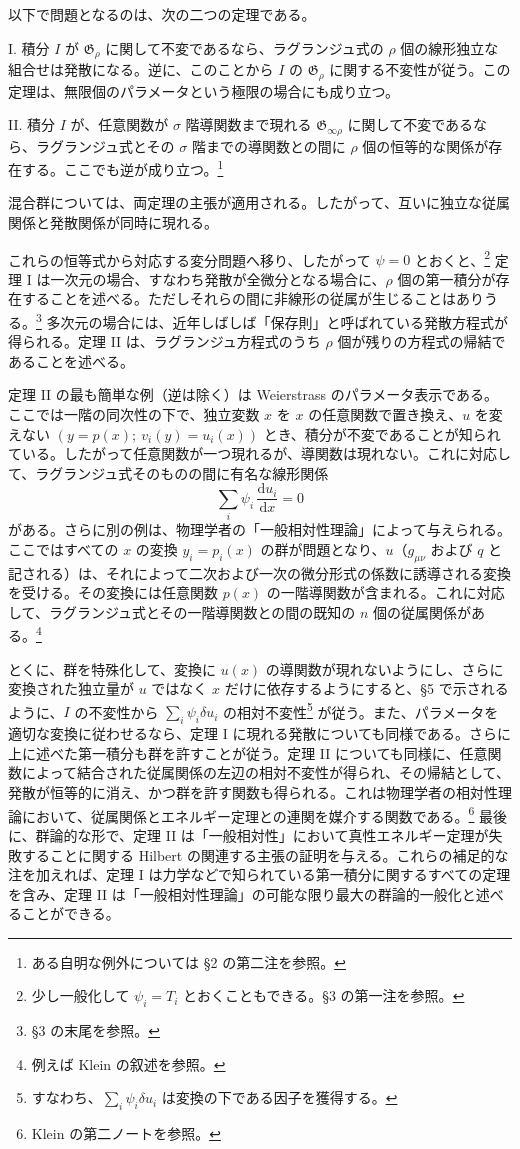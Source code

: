 \documentclass[11pt]{article}
\providecommand{\dd}{\mathrm d}
\providecommand{\G}{\mathfrak G}
\begin{document}
以下で問題となるのは、次の二つの定理である。

I. 積分 \(I\) が \(\G_\rho\) に関して不変であるなら、ラグランジュ式の \(\rho\) 個の線形独立な組合せは発散になる。逆に、このことから \(I\) の \(\G_\rho\) に関する不変性が従う。この定理は、無限個のパラメータという極限の場合にも成り立つ。

II. 積分 \(I\) が、任意関数が \(\sigma\) 階導関数まで現れる \(\G_{\infty\rho}\) に関して不変であるなら、ラグランジュ式とその \(\sigma\) 階までの導関数との間に \(\rho\) 個の恒等的な関係が存在する。ここでも逆が成り立つ。\footnote{ある自明な例外については \S{}2 の第二注を参照。}

混合群については、両定理の主張が適用される。したがって、互いに独立な従属関係と発散関係が同時に現れる。

これらの恒等式から対応する変分問題へ移り、したがって \(\psi=0\) とおくと、\footnote{少し一般化して \(\psi_i=T_i\) とおくこともできる。\S{}3 の第一注を参照。} 定理 I は一次元の場合、すなわち発散が全微分となる場合に、\(\rho\) 個の第一積分が存在することを述べる。ただしそれらの間に非線形の従属が生じることはありうる。\footnote{\S{}3 の末尾を参照。} 多次元の場合には、近年しばしば「保存則」と呼ばれている発散方程式が得られる。定理 II は、ラグランジュ方程式のうち \(\rho\) 個が残りの方程式の帰結であることを述べる。

定理 II の最も簡単な例（逆は除く）は Weierstrass のパラメータ表示である。ここでは一階の同次性の下で、独立変数 \(x\) を \(x\) の任意関数で置き換え、\(u\) を変えない \((y=p(x);\ v_i(y)=u_i(x))\) とき、積分が不変であることが知られている。したがって任意関数が一つ現れるが、導関数は現れない。これに対応して、ラグランジュ式そのものの間に有名な線形関係
\[
\sum_i \psi_i\,\frac{\dd u_i}{\dd x}=0
\]
がある。さらに別の例は、物理学者の「一般相対性理論」によって与えられる。ここではすべての \(x\) の変換 \(y_i=p_i(x)\) の群が問題となり、\(u\)（\(g_{\mu\nu}\) および \(q\) と記される）は、それによって二次および一次の微分形式の係数に誘導される変換を受ける。その変換には任意関数 \(p(x)\) の一階導関数が含まれる。これに対応して、ラグランジュ式とその一階導関数との間の既知の \(n\) 個の従属関係がある。\footnote{例えば Klein の叙述を参照。}

とくに、群を特殊化して、変換に \(u(x)\) の導関数が現れないようにし、さらに変換された独立量が \(u\) ではなく \(x\) だけに依存するようにすると、\S{}5 で示されるように、\(I\) の不変性から \(\sum_i\psi_i\delta u_i\) の相対不変性\footnote{すなわち、\(\sum_i\psi_i\delta u_i\) は変換の下である因子を獲得する。} が従う。また、パラメータを適切な変換に従わせるなら、定理 I に現れる発散についても同様である。さらに上に述べた第一積分も群を許すことが従う。定理 II についても同様に、任意関数によって結合された従属関係の左辺の相対不変性が得られ、その帰結として、発散が恒等的に消え、かつ群を許す関数も得られる。これは物理学者の相対性理論において、従属関係とエネルギー定理との連関を媒介する関数である。\footnote{Klein の第二ノートを参照。} 最後に、群論的な形で、定理 II は「一般相対性」において真性エネルギー定理が失敗することに関する Hilbert の関連する主張の証明を与える。これらの補足的な注を加えれば、定理 I は力学などで知られている第一積分に関するすべての定理を含み、定理 II は「一般相対性理論」の可能な限り最大の群論的一般化と述べることができる。
\end{document}
